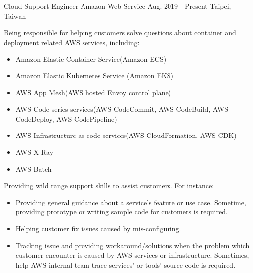 

\begin{cventries}

    \cventry
        {Cloud Support Engineer}
        {Amazon Web Service}
        {Aug. 2019 - Present}
        {Taipei, Taiwan}
        {
            \begin{cvitems}
                \item
                    {
                        Being responsible for helping customers solve questions about container and deployment related AWS services, including:
                        \begin{itemize}
                            \item Amazon Elastic Container Service(Amazon ECS) 
                            \item Amazon Elastic Kubernetes Service (Amazon EKS)
                            \item AWS App Mesh(AWS hosted Envoy control plane)
                            \item AWS Code-series services(AWS CodeCommit, AWS CodeBuild, AWS CodeDeploy, AWS CodePipeline)
                            \item AWS Infrastructure as code services(AWS CloudFormation, AWS CDK) 
                            \item AWS X-Ray
                            \item AWS Batch
                        \end{itemize}
                    }
                \item
                    {
                        Providing wild range support skills to assist customers. For instance:
                        \begin{itemize}
                            \item Providing general guidance about a service's feature or use case. Sometime, providing prototype or writing sample code for customers is required.
                            \item Helping customer fix issues caused by mis-configuring.
                            \item Tracking issue and providing workaround/solutions when the problem which customer encounter is caused by AWS services or infrastructure. Sometimes, help AWS internal team trace services' or tools' source code is required.

\end{itemize}}
\end{cvitems}}
\end{cventries}
